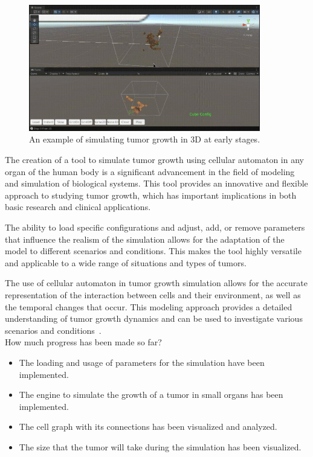 \documentclass[a4paper,11pt]{article}
\begin{document}
{\begin{figure}[h]
  \centering
  \includegraphics[width=0.9\textwidth]{tumor.jpg}
  \caption{An example of simulating tumor growth in 3D at early stages.}
\end{figure}

The creation of a tool to simulate tumor growth using cellular automaton in any organ of the human body is a significant advancement in the field of modeling and simulation of biological systems. This tool provides an innovative and flexible approach to studying tumor growth, which has important implications in both basic research and clinical applications.

The ability to load specific configurations and adjust, add, or remove parameters that influence the realism of the simulation allows for the adaptation of the model to different scenarios and conditions. This makes the tool highly versatile and applicable to a wide range of situations and types of tumors.

The use of cellular automaton in tumor growth simulation allows for the accurate representation of the interaction between cells and their environment, as well as the temporal changes that occur. This modeling approach provides a detailed understanding of tumor growth dynamics and can be used to investigate various scenarios and conditions~\cite{2}.\\

How much progress has been made so far?
\begin{itemize}
    \item The loading and usage of parameters for the simulation have been implemented.
    \item The engine to simulate the growth of a tumor in small organs has been implemented.
    \item The cell graph with its connections has been visualized and analyzed.
    \item The size that the tumor will take during the simulation has been visualized.
\end{itemize}

}
\end{document}
